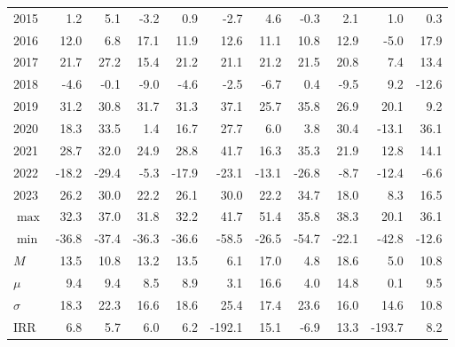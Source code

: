 \documentclass{article}
\begin{document}
\begin{table}[!ht]
\begin{tabular}{l | rrrr | rr | rr| rr}
2015 & 1.2 & \cellcolor{green!25}5.1 & \cellcolor{red!25}-3.2 & 0.9 & -2.7 & 4.6 & -0.3 & 2.1 & 1.0 & 0.3 \\
2016 & 12.0 & 6.8 & 17.1 & 11.9 & 12.6 & 11.1 & 10.8 & 12.9 & \cellcolor{red!25}-5.0 & \cellcolor{green!25}17.9 \\
2017 & 21.7 & \cellcolor{green!25}27.2 & 15.4 & 21.2 & 21.1 & 21.2 & 21.5 & 20.8 & \cellcolor{red!25}7.4 & 13.4 \\
2018 & -4.6 & -0.1 & -9.0 & -4.6 & -2.5 & -6.7 & 0.4 & -9.5 & \cellcolor{green!25}9.2 & \cellcolor{red!25}-12.6 \\
2019 & 31.2 & 30.8 & 31.7 & 31.3 & \cellcolor{green!25}37.1 & 25.7 & 35.8 & 26.9 & 20.1 & \cellcolor{red!25}9.2 \\
2020 & 18.3 & 33.5 & 1.4 & 16.7 & 27.7 & 6.0 & 3.8 & 30.4 & \cellcolor{red!25}-13.1 & \cellcolor{green!25}36.1 \\
2021 & 28.7 & 32.0 & 24.9 & 28.8 & \cellcolor{green!25}41.7 & 16.3 & 35.3 & 21.9 & \cellcolor{red!25}12.8 & 14.1 \\
2022 & -18.2 & \cellcolor{red!25}-29.4 & \cellcolor{green!25}-5.3 & -17.9 & -23.1 & -13.1 & -26.8 & -8.7 & -12.4 & -6.6 \\
2023 & 26.2 & 30.0 & 22.2 & 26.1 & 30.0 & 22.2 & \cellcolor{green!25}34.7 & 18.0 & \cellcolor{red!25}8.3 & 16.5 \\\hline
$\max$ & 32.3 & 37.0 & 31.8 & 32.2 & 41.7 & \cellcolor{green!25}51.4 & 35.8 & 38.3 & \cellcolor{red!25}20.1 & 36.1 \\
$\min$ & -36.8 & -37.4 & -36.3 & -36.6 & \cellcolor{red!25}-58.5 & -26.5 & -54.7 & -22.1 & -42.8 & \cellcolor{green!25}-12.6 \\
$M$ & 13.5 & 10.8 & 13.2 & 13.5 & 6.1 & 17.0 & \cellcolor{red!25}4.8 & \cellcolor{green!25}18.6 & 5.0 & 10.8 \\
$\mu$  & 9.4 & 9.4 & 8.5 & 8.9 & 3.1 & \cellcolor{green!25}16.6 & 4.0 & 14.8 & \cellcolor{red!25}0.1 & 9.5 \\
$\sigma$ & 18.3 & 22.3 & 16.6 & 18.6 & \cellcolor{green!25}25.4 & 17.4 & 23.6 & 16.0 & 14.6 & \cellcolor{red!25}10.8 \\
IRR & 6.8 & 5.7 & 6.0 & 6.2 & -192.1 & \cellcolor{green!25}15.1 & -6.9 & 13.3 & \cellcolor{red!25}-193.7 & 8.2 \\

\hline
    \end{tabular}
    \label{tab_comparison}
  
\end{table}
\end{document}
